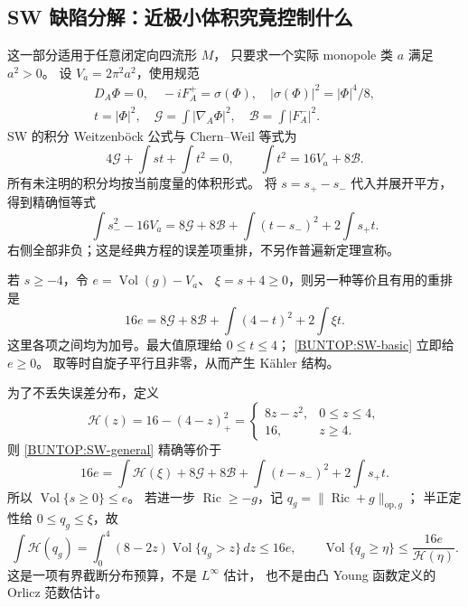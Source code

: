 \documentclass[UTF8,fontset=fandol,zihao=-4,oneside,openany]{ctexbook}
\theoremstyle{cjkplain}
\numberwithin{equation}{chapter}
\begin{document}
\subsection{SW 缺陷分解：近极小体积究竟控制什么}
\label{BUNTOP:SW-defect}

这一部分适用于任意闭定向四流形 \(M\)，
只要求一个实际 monopole 类 \(a\) 满足 \(a^2>0\)。
设 \(V_a=2\pi^2a^2\)，使用规范
\[
 \begin{gathered}
 D_A\Phi=0,\quad -iF_A^+=\sigma(\Phi),\quad
 |\sigma(\Phi)|^2=|\Phi|^4/8,\\
 t=|\Phi|^2,\quad
 \mathcal G=\int|\nabla_A\Phi|^2,\quad
 \mathcal B=\int|F_A^-|^2 .
 \end{gathered}
\]
SW 的积分 Weitzenb\"ock 公式与 Chern--Weil 等式为
\begin{equation}
 4\mathcal G+\int st+\int t^2=0,\qquad
 \int t^2=16V_a+8\mathcal B .
 \label{BUNTOP:SW-basic}
\end{equation}
所有未注明的积分均按当前度量的体积形式。
将 \(s=s_+-s_-\) 代入并展开平方，得到精确恒等式
\begin{equation}
 \int s_-^2-16V_a
 =8\mathcal G+8\mathcal B+\int(t-s_-)^2+2\int s_+t .
 \label{BUNTOP:SW-general}
\end{equation}
右侧全部非负；这是经典方程的误差项重排，不另作普遍新定理宣称。

若 \(s\ge-4\)，令 \(e=\operatorname{Vol}(g)-V_a\)、
\(\xi=s+4\ge0\)，则另一种等价且有用的重排是
\begin{equation}
 16e=8\mathcal G+8\mathcal B+\int(4-t)^2+2\int\xi t .
 \label{BUNTOP:SW-four}
\end{equation}
这里各项之间均为加号。最大值原理给 \(0\le t\le4\)；
\eqref{BUNTOP:SW-basic} 立即给 \(e\ge0\)。
取等时自旋子平行且非零，从而产生 K\"ahler 结构。

为了不丢失误差分布，定义
\[
 \mathcal H(z)=16-(4-z)_+^2
 =\begin{cases}8z-z^2,&0\le z\le4,\\16,&z\ge4.\end{cases}
\]
则 \eqref{BUNTOP:SW-general} 精确等价于
\begin{equation}
 16e=\int\mathcal H(\xi)
       +8\mathcal G+8\mathcal B
       +\int(t-s_-)^2+2\int s_+t .
 \label{BUNTOP:SW-distribution}
\end{equation}
所以 \(\operatorname{Vol}\{s\ge0\}\le e\)。
若进一步 \(\operatorname{Ric}\ge-g\)，记
\(q_g=\|\operatorname{Ric}+g\|_{\mathrm{op},g}\)；
半正定性给 \(0\le q_g\le\xi\)，故
\begin{equation}
 \int\mathcal H(q_g)
 =\int_0^4(8-2z)\operatorname{Vol}\{q_g>z\}\,dz
 \le16e,\qquad
 \operatorname{Vol}\{q_g\ge\eta\}\le\frac{16e}{\mathcal H(\eta)} .
 \label{BUNTOP:Ric-distribution}
\end{equation}
这是一项有界截断分布预算，不是 \(L^\infty\) 估计，
也不是由凸 Young 函数定义的 Orlicz 范数估计。
\end{document}
